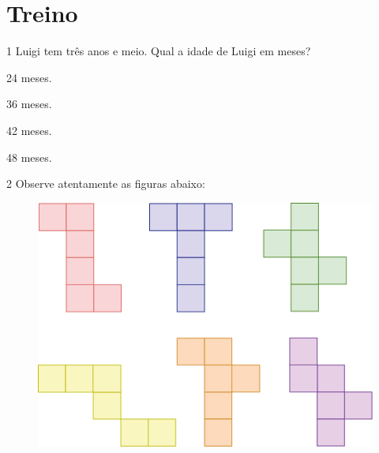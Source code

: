 \pagebreak
\section*{Treino}

\num{1} Luigi tem três anos e meio. Qual a idade de Luigi em meses?

\begin{multicols}{2}
\begin{escolha}
\item 24 meses. 

\item 36 meses.

\item 42 meses. 

\item 48 meses.
\end{escolha}
\end{multicols}


\num{2} Observe atentamente as figuras abaixo:

\begin{figure}[htpb!]
\centering
\includegraphics[width=.7\textwidth]{media/image36.png}
\end{figure}

